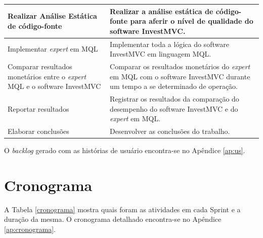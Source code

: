 \begin{center}
\begin{longtable}{| p{8cm} | p{8cm} |}
	Realizar Análise Estática de código-fonte & Realizar a análise estática de código-fonte para aferir o nível de qualidade do  software InvestMVC.\\ \hline
	Implementar \textit{expert} em MQL & Implementar toda a lógica do software InvestMVC em linguagem MQL.\\ \hline
	Comparar resultados monetários entre o \textit{expert} MQL e o software InvestMVC & Comparar os resultados monetários do \textit{expert} em MQL com o software InvestMVC durante um tempo a se determinado de operação.\\ \hline
	Reportar resultados & Registrar os resultados da comparação do desempenho do software InvestMVC e do \textit{expert} em MQL.\\ \hline
	Elaborar conclusões & Desenvolver as conclusões do trabalho.
\label{atividadeMetologia}
\end{longtable}
\end{center}

O \textit{backlog} gerado com as histórias de usuário encontra-se no Apêndice \ref{ap:us}.

\section{Cronograma}

A Tabela \ref{cronograma} mostra quais foram as atividades em cada Sprint e a duração da mesma. O cronograma detalhado encontra-se no Apêndice \ref{ap:cronograma}.

